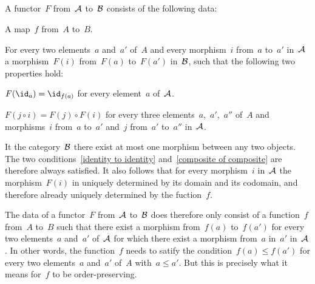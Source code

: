 \subsection{}

A functor~$F$ from~$\mathcal{A}$ to~$\mathcal{B}$ consists of the following data:
\begin{itemize*}
	\item
		A map~$f$ from~$A$ to~$B$.
	\item
		For every two elements~$a$ and~$a'$ of~$A$ and every morphism~$i$ from~$a$ to~$a'$ in~$\mathcal{A}$ a morphism~$F(i)$ from~$F(a)$ to~$F(a')$ in~$\mathcal{B}$, such that the following two properties hold:
		\begin{enumerate*}
			\item
				\label{identity to identity}
				$F(\id_a) = \id_{f(a)}$ for every element~$a$ of~$\mathcal{A}$.
			\item
				\label{composite of composite}
				$F(j \circ i) = F(j) \circ F(i)$ for every three elements~$a$,~$a'$,~$a''$ of~$A$ and morphisms~$i$ from~$a$ to~$a'$ and~$j$ from~$a'$ to~$a''$ in~$\mathcal{A}$.
		\end{enumerate*}
\end{itemize*}

It the category~$\mathcal{B}$ there exist at most one morphism between any two objects.
The two conditions~\ref{identity to identity} and~\ref{composite of composite} are therefore always satisfied.
It also follows that for every morphism~$i$ in~$\mathcal{A}$ the morphism~$F(i)$ in uniquely determined by its domain and its codomain, and therefore already uniquely determined by the fuction~$f$.

The data of a functor~$F$ from~$\mathcal{A}$ to~$\mathcal{B}$ does therefore only consist of a function~$f$ from~$A$ to~$B$ such that there exist a morphism from~$f(a)$ to~$f(a')$ for every two elements~$a$ and~$a'$ of~$\mathcal{A}$ for which there exist a morphism from~$a$ in~$a'$ in~$\mathcal{A}$.
In other words, the function~$f$ needs to satify the condition~$f(a) \leq f(a')$ for every two elements~$a$ and~$a'$ of~$A$ with~$a \leq a'$.
But this is precisely what it means for~$f$ to be order-preserving.

